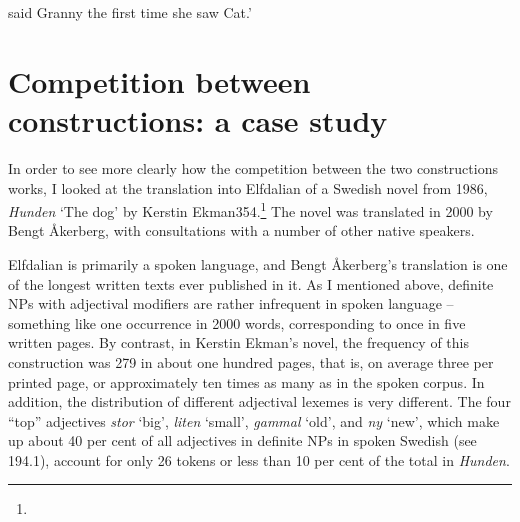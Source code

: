 \begin{styleTranslation}
 said Granny the first time she saw Cat.’

\end{styleTranslation}

\section{Competition between constructions: a case study}

\begin{styleBodyTextFirst}
In order to see more clearly how the competition between the two constructions works, I looked at the translation into Elfdalian of a Swedish novel from 1986, \textit{Hunden} ‘The dog’ by Kerstin Ekman354.\footnote{} The novel was translated in 2000 by Bengt Åkerberg, with consultations with a number of other native speakers. 

\end{styleBodyTextFirst}

\begin{styleBodytextC}
Elfdalian is primarily a spoken language, and Bengt Åkerberg’s translation is one of the longest written texts ever published in it. As I mentioned above, definite NPs with adjectival modifiers are rather infrequent in spoken language – something like one occurrence in 2000 words, corresponding to once in five written pages. By contrast, in Kerstin Ekman’s novel, the frequency of this construction was 279 in about one hundred pages, that is, on average three per printed page, or approximately ten times as many as in the spoken corpus. In addition, the distribution of different adjectival lexemes is very different. The four “top” adjectives \textit{stor }‘big’, \textit{liten} ‘small’, \textit{gammal} ‘old’, and \textit{ny} ‘new’, which make up about 40 per cent of all adjectives in definite NPs in spoken Swedish (see 194.1), account for only 26 tokens or less than 10 per cent of the total in \textit{Hunden}.

\end{styleBodytextC}

